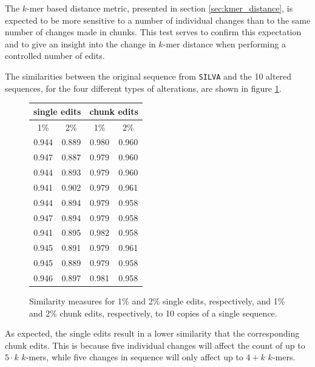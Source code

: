 The $k$-mer based distance metric, presented in section
\ref{sec:kmer_distance}, is expected to be more sensitive to a number of
individual changes than to the same number of changes made in chunks. This test
serves to confirm this expectation and to give an insight into the change in
$k$-mer distance when performing a controlled number of edits.

The similarities between the original sequence from \texttt{SILVA} and the 10
altered sequences, for the four different types of alterations, are shown in
figure \ref{fig:altered_seqs_similarities}.

\begin{figure}[H]
  \centering
  \begin{tabular}{c|c||c|c}
    \multicolumn{2}{c||}{single edits}  & \multicolumn{2}{c}{chunk edits} \\
    \hline\hline
    1\%   &   2\%                   &   1\%   &   2\% \\
    \hline
    0.944   & 0.889                     & 0.980     & 0.960 \\
    0.947   & 0.887                     & 0.979     & 0.960 \\
    0.944   & 0.893                     & 0.979     & 0.960 \\
    0.941   & 0.902                     & 0.979     & 0.961 \\
    0.944   & 0.894                     & 0.979     & 0.958 \\
    0.947   & 0.894                     & 0.979     & 0.958 \\
    0.941   & 0.895                     & 0.982     & 0.958 \\
    0.945   & 0.891                     & 0.979     & 0.961 \\
    0.945   & 0.889                     & 0.979     & 0.958 \\
    0.946   & 0.897                     & 0.981     & 0.958
  \end{tabular}
  \caption{Similarity measures for 1\% and 2\% single edits, respectively,
    and 1\% and 2\% chunk edits, respectively, to 10 copies of a single
    sequence.}
  \label{fig:altered_seqs_similarities}
\end{figure}

As expected, the single edits result in a lower similarity that the
corresponding chunk edits. This is because five individual changes will affect
the count of up to $5 \cdot k$ $k$-mers, while five changes in sequence will
only affect up to $4+k$ $k$-mers.


